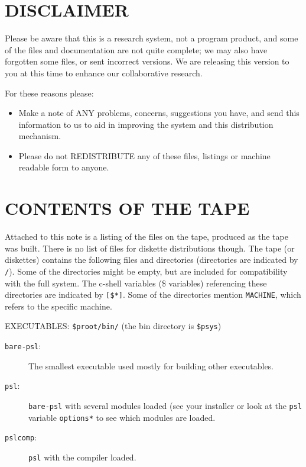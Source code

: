\section{DISCLAIMER}

Please be aware that this is a research system, not a program product, 
and some of the files and documentation are not quite complete; 
we may also have forgotten some files, or sent incorrect versions.  
We are releasing this version to you at this time to enhance our 
collaborative research.

For these reasons please:

\begin{itemize}

\item Make a note of ANY problems, concerns, suggestions you have, 
and send this information to us to aid in improving the system and 
this distribution mechanism.

\item Please do not REDISTRIBUTE any of these files, listings or 
machine readable form to anyone.

\end{itemize}

\section{CONTENTS OF THE TAPE}

Attached to this note is a listing of the files on the tape, produced
as the tape was built.  There is no list of files for diskette
distributions though.
The tape (or diskettes) contains the following files and directories
(directories are indicated by {\tt */}). Some of the directories
might be empty, but are included for compatibility with the full
system. The c-shell variables (\$ variables) referencing these
directories are indicated by {\tt [\$*]}.  Some of the directories
mention {\tt MACHINE}, which refers to the specific machine.  

\vskip 12pt
\noindent
EXECUTABLES: {\tt \$proot/bin/} (the bin directory is {\tt \$psys})

\begin{description}

\item[{\tt bare-psl}:] The smallest executable used mostly for
building other executables. 

\item[{\tt psl}:] {\tt bare-psl} with several modules loaded (see your
installer or look at the {\tt psl} variable {\tt options*} to see which
modules are loaded.

\item[{\tt pslcomp}:] {\tt psl} with the compiler loaded.

\end{description}

